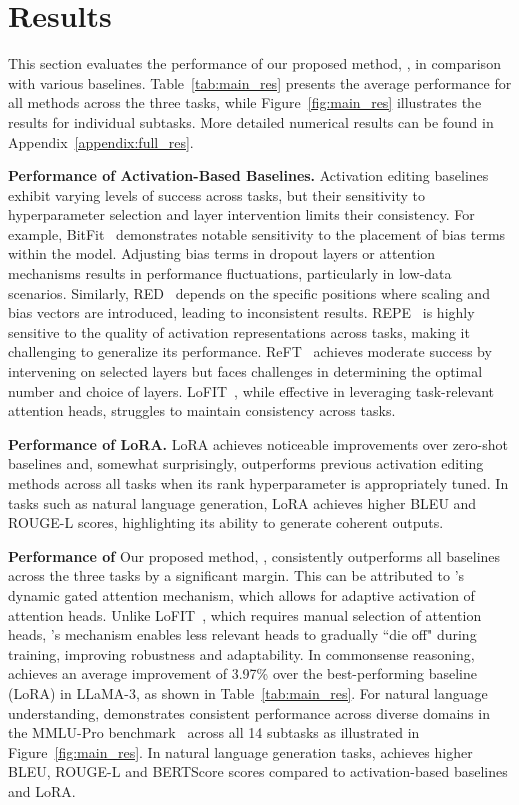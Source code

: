 \section{Results}
\label{sec:res}
This section evaluates the performance of our proposed method, \jola{}, in comparison with various baselines.
Table~\ref{tab:main_res} presents the average performance for all methods across the three tasks, while Figure~\ref{fig:main_res} illustrates the results for individual subtasks.
More detailed numerical results can be found in Appendix~\ref{appendix:full_res}.



\noindent\textbf{Performance of Activation-Based Baselines.}
Activation editing baselines exhibit varying levels of success across tasks, but their sensitivity to hyperparameter selection and layer intervention limits their consistency.
For example, BitFit~\cite{ben-zaken-etal-2022-bitfit} demonstrates notable sensitivity to the placement of bias terms within the model.
Adjusting bias terms in dropout layers or attention mechanisms results in performance fluctuations, particularly in low-data scenarios.
Similarly, RED~\cite{wu-etal-2024-advancing} depends on the specific positions where scaling and bias vectors are introduced, leading to inconsistent results.
REPE~\cite{zou2023representation} is highly sensitive to the quality of activation representations across tasks, making it challenging to generalize its performance.
ReFT~\cite{wu2024reft} achieves moderate success by intervening on selected layers but faces challenges in determining the optimal number and choice of layers.
LoFIT~\cite{yin2024lofit}, while effective in leveraging task-relevant attention heads, struggles to maintain consistency across tasks.

\noindent\textbf{Performance of LoRA.}
LoRA achieves noticeable improvements over zero-shot baselines and, somewhat surprisingly, outperforms previous activation editing methods across all tasks when its rank hyperparameter is appropriately tuned. 
In tasks such as natural language generation, LoRA achieves higher BLEU and ROUGE-L scores, highlighting its ability to generate coherent outputs.

\noindent\textbf{Performance of \jola{}}
Our proposed method, \jola{}, consistently outperforms all baselines across the three tasks by a significant margin.
This can be attributed to \jola{}'s dynamic gated attention mechanism, which allows for adaptive activation of attention heads.
Unlike LoFIT~\cite{yin2024lofit}, which requires manual selection of attention heads, \jola{}'s mechanism enables less relevant heads to gradually ``die off" during training, improving robustness and adaptability.
In commonsense reasoning, \jola{} achieves an average improvement of 3.97\% over the best-performing baseline (LoRA) in LLaMA-3, as shown in Table~\ref{tab:main_res}.
For natural language understanding, \jola{} demonstrates consistent performance across diverse domains in the MMLU-Pro benchmark~\cite{wang2024mmlu} across all 14 subtasks as illustrated in Figure~\ref{fig:main_res}.
In natural language generation tasks, \jola{} achieves higher BLEU, ROUGE-L and BERTScore scores compared to activation-based baselines and LoRA.